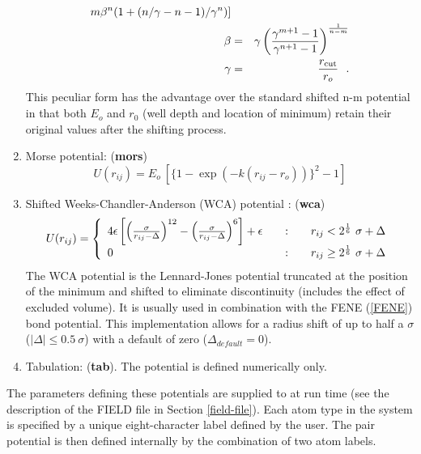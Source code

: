 \begin{enumerate}
\begin{eqnarray}
{m\beta^{n}(1+(n/\gamma-n-1)/\gamma^{n})]} \nonumber \\
\beta &=& \gamma\left( \frac{\gamma^{m+1}-1}{\gamma^{n+1}-1}
\right)^{\frac{1}{n-m}} \\
\gamma &=& \frac{r_{\rm cut}}{r_{o}}~~. \nonumber
\end{eqnarray}
This peculiar form has the advantage over the standard shifted n-m
potential in that both $E_{o}$ and $r_{0}$ (well depth and location of
minimum) retain their original values after the shifting process.
\item Morse potential:  ({\bf mors})
\begin{equation}
U(r_{ij}) = E_{o}~[\{1-\exp(-k(r_{ij}-r_{o}))\}^{2}-1]
\end{equation}
\item Shifted Weeks-Chandler-Anderson (WCA) potential \cite{weeks-71}:  ({\bf wca})
\begin{equation}
U(r_{ij}) = \left\{ \begin{array} {l@{\qquad:\qquad}l}
4\epsilon\left[\left(\frac{\sigma}{r_{ij}-\Delta}\right)^{12}-\left(\frac{\sigma}{r_{ij}-\Delta}\right)^{6}\right]
+\epsilon & r_{ij} < 2^{1 \over 6}~\sigma + \Delta \\
0 & r_{ij} \ge 2^{1 \over 6}~\sigma + \Delta \end{array} \right. \label{wca}
\end{equation}
The WCA potential is the Lennard-Jones potential truncated at the
position of the minimum and shifted to eliminate discontinuity
(includes the effect of excluded volume).  It is usually used in
combination with the FENE (\ref{FENE}) bond potential.  This
implementation allows for a radius shift of up to half a $\sigma$
($|\Delta| \le 0.5~\sigma$) with a default of zero
($\Delta_{default} = 0$).
\item Tabulation:  ({\bf tab}).  The potential is defined
numerically only.
\end{enumerate}

The parameters defining these potentials are supplied to \D at run
time (see the description of the FIELD file in Section
\ref{field-file}).  Each atom type in the system is specified by a
unique eight-character label defined by the user.  The pair
potential is then defined internally by the combination of two
atom labels.

